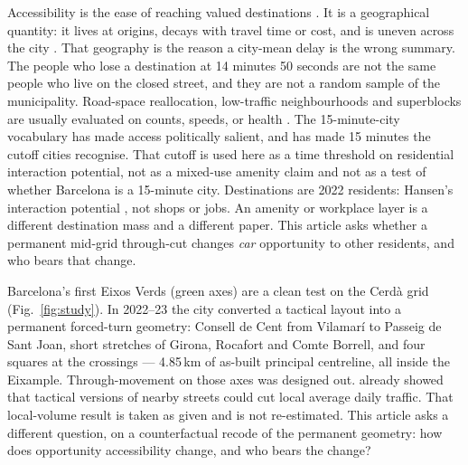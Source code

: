 \documentclass[a4paper,fleqn]{cas-dc}
\begin{document}
Accessibility is the ease of reaching valued destinations
\citep{Hansen1959,Geurs2004,Paez2012,Wu2020}. It is a geographical quantity:
it lives at origins, decays with travel time or cost, and is uneven across
the city \citep{Kwan1998,Miller1999,Neutens2015}. That geography is the
reason a city-mean delay is the wrong summary. The people who lose a
destination at 14 minutes 50 seconds are not the same people who live on the
closed street, and they are not a random sample of the municipality.
Road-space reallocation, low-traffic neighbourhoods and superblocks are
usually evaluated on counts, speeds, or health
\citep{Cairns1998,Cairns2002,NelloDeakin2022,Thomas2024,Mueller2020,Banister2008}.
The 15-minute-city vocabulary \citep{Moreno2021,Pozoukidou2021} has made
access politically salient, and has made 15 minutes the cutoff cities
recognise. That cutoff is used here as a time threshold on residential
interaction potential, not as a mixed-use amenity claim and not as a test of
whether Barcelona is a 15-minute city. Destinations are 2022 residents:
Hansen's interaction potential \citep{Hansen1959}, not shops or jobs. An
amenity or workplace layer is a different destination mass and a different
paper. This article asks whether a permanent mid-grid through-cut changes
\emph{car} opportunity to other residents, and who bears that change.

Barcelona's first Eixos Verds (green axes) are a clean test on the Cerd\`a
grid (Fig.~\ref{fig:study}).
In 2022--23 the city converted a tactical layout into a permanent forced-turn
geometry: Consell de Cent from Vilamar\'i to Passeig de Sant Joan, short
stretches of Girona, Rocafort and Comte Borrell, and four squares at the
crossings --- 4.85\,km of as-built principal centreline, all inside the
Eixample. Through-movement on those axes was designed out.
\citet{NelloDeakin2022} already showed that tactical versions of nearby
streets could cut local average daily traffic. That local-volume result is
taken as given and is not re-estimated. This article asks a different
question, on a counterfactual recode of the permanent geometry: how does
opportunity accessibility change, and who bears the change?
\end{document}
